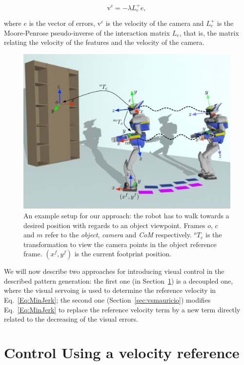 $$
\text{v}^c = -\lambda L_e^{+}e,
$$

where $e$ is the vector of errors, $\text{v}^c$ is the velocity of the camera and $L_e^{+}$ is the Moore-Penrose pseudo-inverse of the interaction matrix $L_e$, that is, the matrix relating the velocity of the features and the velocity of the camera.

\begin{figure}[ht] 
\begin{center}
\includegraphics[scale=0.5]{Chap4-Visual-Servoing/schema_new.pdf} 
\caption{ An example setup for our approach: the robot has to walk towards a desired position with regards to an object viewpoint. Frames $o$, $c$ and $m$ refer to the {\it object}, {\it camera} and {\it CoM} respectively. $^o T_c$ is the transformation to view the camera points in the object reference frame. $(x^f, y^f)$ is the current footprint position.} 
\label{Fig:Schema}
\end{center}
\end{figure}

We will now describe two approaches for introducing visual control in the described pattern generation: the first one (in Section~\ref{sec:vsclaire}) is a decoupled one, where the visual servoing is used to determine the reference velocity in Eq.~\ref{Eq:MinJerk}; the second one (Section~\ref{sec:vsmauricio}) modifies Eq.~\ref{Eq:MinJerk} to replace the reference velocity term by a new term directly related to the decreasing of the visual errors.


\section{Control Using a velocity reference}
\label{sec:vsclaire}


